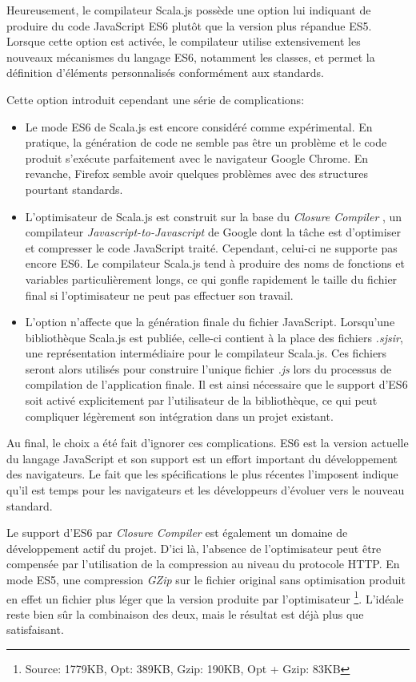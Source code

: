 Heureusement, le compilateur Scala.js possède une option lui indiquant de produire du code JavaScript ES6 plutôt que la version plus répandue ES5. Lorsque cette option est activée, le compilateur utilise extensivement les nouveaux mécanismes du langage ES6, notamment les classes, et permet la définition d'éléments personnalisés conformément aux standards.

Cette option introduit cependant une série de complications:

\begin{itemize}
	\item Le mode ES6 de Scala.js est encore considéré comme expérimental. En pratique, la génération de code ne semble pas être un problème et le code produit s'exécute parfaitement avec le navigateur Google Chrome. En revanche, Firefox semble avoir quelques problèmes avec des structures pourtant standards.
	\item L'optimisateur de Scala.js est construit sur la base du \emph{Closure Compiler} \cite{closure-compiler}, un compilateur \emph{Javascript-to-Javascript} de Google dont la tâche est d'optimiser et compresser le code JavaScript traité. Cependant, celui-ci ne supporte pas encore ES6. Le compilateur Scala.js tend à produire des noms de fonctions et variables particulièrement longs, ce qui gonfle rapidement le taille du fichier final si l'optimisateur ne peut pas effectuer son travail.
	\item L'option n'affecte que la génération finale du fichier JavaScript. Lorsqu'une bibliothèque Scala.js est publiée, celle-ci contient à la place des fichiers \emph{.sjsir}, une représentation intermédiaire pour le compilateur Scala.js. Ces fichiers seront alors utilisés pour construire l'unique fichier \emph{.js} lors du processus de compilation de l'application finale. Il est ainsi nécessaire que le support d'ES6 soit activé explicitement par l'utilisateur de la bibliothèque, ce qui peut compliquer légèrement son intégration dans un projet existant.
\end{itemize}

Au final, le choix a été fait d'ignorer ces complications. ES6 est la version actuelle du langage JavaScript et son support est un effort important du développement des navigateurs. Le fait que les spécifications le plus récentes l'imposent indique qu'il est temps pour les navigateurs et les développeurs d'évoluer vers le nouveau standard.

Le support d'ES6 par \emph{Closure Compiler} est également un domaine de développement actif du projet. D'ici là, l'absence de l'optimisateur peut être compensée par l'utilisation de la compression au niveau du protocole HTTP. En mode ES5, une compression \emph{GZip} sur le fichier original sans optimisation produit en effet un fichier plus léger que la version produite par l'optimisateur \footnote{Source: 1779KB, Opt: 389KB, Gzip: 190KB, Opt + Gzip: 83KB}. L'idéale reste bien sûr la combinaison des deux, mais le résultat est déjà plus que satisfaisant.

